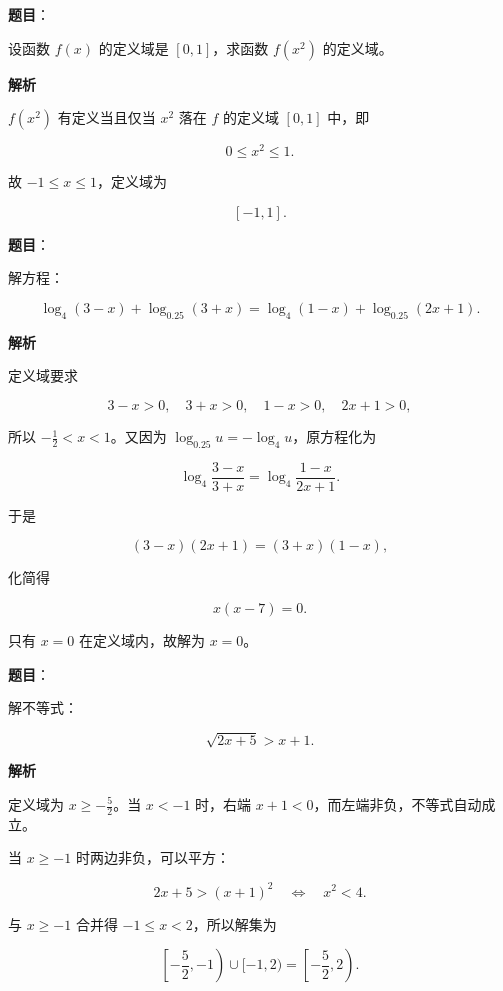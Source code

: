 \begin{answer}

\textbf{题目}：

设函数 $f(x)$ 的定义域是 $[0,1]$，求函数 $f(x^2)$ 的定义域。

\textbf{解析}

$f(x^2)$ 有定义当且仅当 $x^2$ 落在 $f$ 的定义域 $[0,1]$ 中，即

\nopagebreak[4]
\[
0\le x^2\le1.
\]

故 $-1\le x\le1$，定义域为

\nopagebreak[4]
\[
[-1,1].
\]


\end{answer}
\begin{answer}

\textbf{题目}：

解方程：

\nopagebreak[4]
\[
\log_4(3-x)+\log_{0.25}(3+x)
=\log_4(1-x)+\log_{0.25}(2x+1).
\]

\textbf{解析}

定义域要求

\nopagebreak[4]
\[
3-x>0,\quad 3+x>0,\quad 1-x>0,\quad 2x+1>0,
\]

所以 $-\frac12<x<1$。又因为 $\log_{0.25}u=-\log_4u$，原方程化为

\nopagebreak[4]
\[
\log_4\frac{3-x}{3+x}
=\log_4\frac{1-x}{2x+1}.
\]

于是

\nopagebreak[4]
\[
(3-x)(2x+1)=(3+x)(1-x),
\]

化简得

\nopagebreak[4]
\[
x(x-7)=0.
\]

只有 $x=0$ 在定义域内，故解为 $x=0$。


\end{answer}
\begin{answer}

\textbf{题目}：

解不等式：

\nopagebreak[4]
\[
\sqrt{2x+5}>x+1.
\]

\textbf{解析}

定义域为 $x\ge-\frac52$。当 $x<-1$ 时，右端 $x+1<0$，而左端非负，不等式自动成立。

当 $x\ge-1$ 时两边非负，可以平方：

\nopagebreak[4]
\[
2x+5>(x+1)^2
\quad\Longleftrightarrow\quad
x^2<4.
\]

与 $x\ge-1$ 合并得 $-1\le x<2$，所以解集为

\nopagebreak[4]
\[
\left[-\frac52,-1\right)\cup[-1,2)
=\left[-\frac52,2\right).
\]

\gkanswer{答案：$x\in\left[-\dfrac52,2\right)$}

\end{answer}
